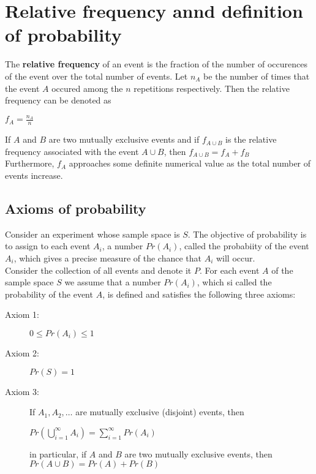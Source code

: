 \documentclass[a4paper]{article}
\begin{document}
\section{Relative frequency annd definition of probability}
The \textbf{relative frequency} of an event is the fraction of the number of occurences of the event over the total number of events.
Let $n_A$ be the number of times that the event $A$ occured among the $n$ repetitions respectively.
Then the relative frequency can be denoted as
\begin{center}
	$f_A = \frac{n_A}{n}$
\end{center}
If $A$ and $B$ are two mutually exclusive events and if $f_{A\cup B}$ is the relative frequency associated with the event $A\cup B$, then $f_{A\cup B} = f_A + f_B$\\
Furthermore, $f_A$ approaches some definite numerical value as the total number of events increase.
\subsection{Axioms of probability}
Consider an experiment whose sample space is $S$. The objective of probability is to assign to each event $A_i$, a number $Pr(A_i)$, called the probabiity of the event $A_i$, which gives a precise measure of the chance that $A_i$ will occur.\\
Consider the collection of all events and denote it $P$. For each event $A$ of the sample space $S$ we assume that a number $Pr(A_i)$, which si called the probability of the event $A$, is defined and satisfies the following three axioms:
\begin{description}
	\item[Axiom 1:] $0 \le Pr(A_i) \le 1$
	\item[Axiom 2:] $Pr(S) = 1$
	\item[Axiom 3:] If $A_1,A_2,\dots$ are mutually exclusive (disjoint) events, then 
	\begin{center}
		$Pr(\bigcup\limits_{i=1}^{\infty}A_i) = \sum\limits_{i=1}^{\infty}Pr(A_i)$
	\end{center}
	in particular, if $A$ and $B$ are two mutually exclusive events, then $Pr(A\cup B) = Pr(A) + Pr(B)$
\end{description}
\end{document}
